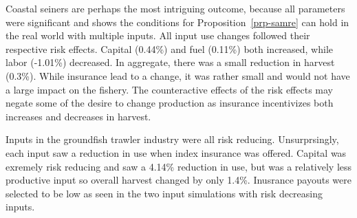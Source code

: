 \documentclass[
  letterpaper,
  DIV=11,
  numbers=noendperiod]{scrartcl}
\theoremstyle{plain}
\theoremstyle{plain}
\theoremstyle{remark}
\begin{document}
Coastal seiners are perhaps the most intriguing outcome, because all
parameters were significant and shows the conditions for
Proposition~\ref{prp-samre} can hold in the real world with multiple
inputs. All input use changes followed their respective risk effects.
Capital (0.44\%) and fuel (0.11\%) both increased, while labor (-1.01\%)
decreased. In aggregate, there was a small reduction in harvest (0.3\%).
While insurance lead to a change, it was rather small and would not have
a large impact on the fishery. The counteractive effects of the risk
effects may negate some of the desire to change production as insurance
incentivizes both increases and decreases in harvest.

Inputs in the groundfish trawler industry were all risk reducing.
Unsurprsingly, each input saw a reduction in use when index insurance
was offered. Capital was exremely risk reducing and saw a 4.14\%
reduction in use, but was a relatively less productive input so overall
harvest changed by only 1.4\%. Inusrance payouts were selected to be low
as seen in the two input simulations with risk decreasing inputs.
\end{document}
